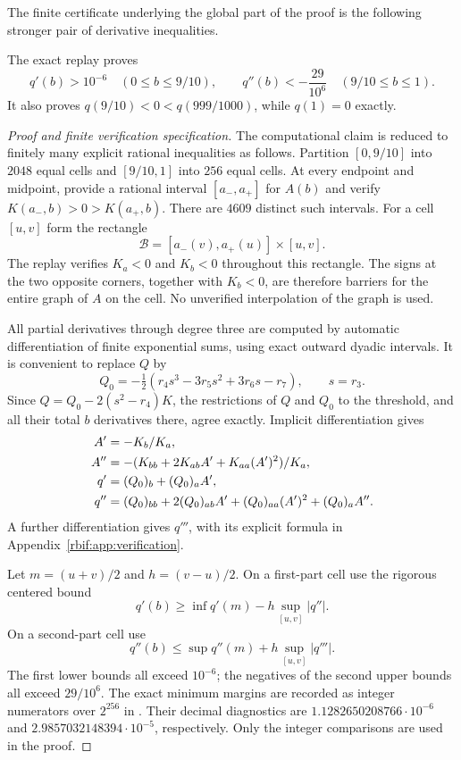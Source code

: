 The finite certificate underlying the global part of the proof is the
following stronger pair of derivative inequalities.
\begin{lemma}
\label{rbif:lem:separation}
The exact replay proves
\begin{equation}
 q'(b)>10^{-6}\quad(0\le b\le9/10),\qquad
 q''(b)<-\frac{29}{10^6}\quad(9/10\le b\le1).
 \label{rbif:eq:separation}
\end{equation}
It also proves $q(9/10)<0<q(999/1000)$, while $q(1)=0$ exactly.
\end{lemma}
\begin{proof}[Proof and finite verification specification]
The computational claim is reduced to finitely many explicit rational
inequalities as follows. Partition $[0,9/10]$ into $2048$ equal cells
and $[9/10,1]$ into $256$ equal cells. At every endpoint and midpoint,
provide a rational interval $[a_-,a_+]$ for $A(b)$ and verify
$K(a_-,b)>0>K(a_+,b)$. There are $4609$ distinct such intervals.
For a cell $[u,v]$ form the rectangle
\[
 \mathcal B=[a_-(v),a_+(u)]\times[u,v].
\]
The replay verifies $K_a<0$ and $K_b<0$ throughout this rectangle.
The signs at the two opposite corners, together with $K_b<0$, are
therefore barriers for the entire graph of $A$ on the cell. No unverified
interpolation of the graph is used.

All partial derivatives through degree three are computed by automatic
differentiation of finite exponential sums, using exact outward dyadic
intervals. It is convenient to replace $Q$ by
\begin{equation}
 Q_0=-\tfrac12(r_4s^3-3r_5s^2+3r_6s-r_7),\qquad s=r_3.
 \label{rbif:eq:Q0}
\end{equation}
Since $Q=Q_0-2(s^2-r_4)K$, the restrictions of $Q$ and $Q_0$ to the
threshold, and all their total $b$ derivatives there, agree exactly.
Implicit differentiation gives
\begin{align}
 A'&=-K_b/K_a,\notag\\
 A''&=-(K_{bb}+2K_{ab}A'+K_{aa}(A')^2)/K_a,\label{rbif:eq:implicitdiff}\\
 q'&=(Q_0)_b+(Q_0)_aA',\notag\\
 q''&=(Q_0)_{bb}+2(Q_0)_{ab}A'+(Q_0)_{aa}(A')^2+(Q_0)_aA''.
 \notag
\end{align}
A further differentiation gives $q'''$, with its explicit formula in
Appendix~\ref{rbif:app:verification}.

Let $m=(u+v)/2$ and $h=(v-u)/2$. On a first-part cell use the rigorous
centered bound
\[
 q'(b)\ge \inf q'(m)-h\sup_{[u,v]}|q''|.
\]
On a second-part cell use
\[
 q''(b)\le \sup q''(m)+h\sup_{[u,v]}|q'''|.
\]
The first lower bounds all exceed $10^{-6}$; the negatives of the second
upper bounds all exceed $29/10^6$. The exact minimum margins are recorded
as integer numerators over $2^{256}$ in .
Their decimal diagnostics are $1.1282650208766\cdot10^{-6}$ and
$2.9857032148394\cdot10^{-5}$, respectively. Only the integer comparisons
are used in the proof.


\end{proof}
